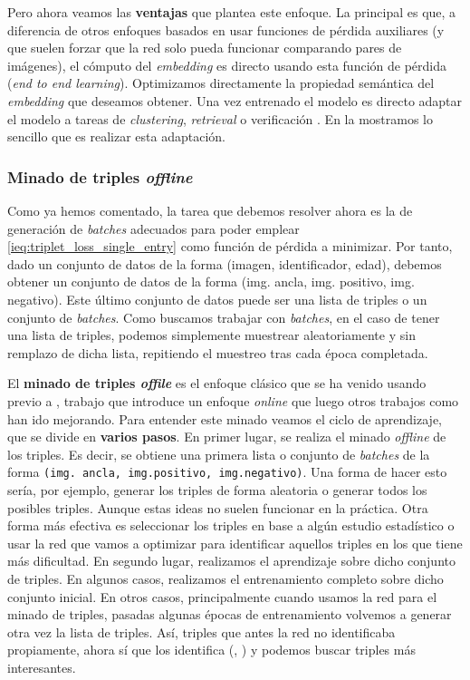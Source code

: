 Pero ahora veamos las \textbf{ventajas} que plantea este enfoque. La principal es que, a diferencia de otros enfoques basados en usar funciones de pérdida auxiliares (y que suelen forzar que la red solo pueda funcionar comparando pares de imágenes), el cómputo del \textit{embedding} es directo usando esta función de pérdida (\textit{end to end learning}). Optimizamos directamente la propiedad semántica del \textit{embedding} que deseamos obtener. Una vez entrenado el modelo es directo adaptar el modelo a tareas de \textit{clustering}, \textit{retrieval} o verificación \cite{informatica:principal}. En la  mostramos lo sencillo que es realizar esta adaptación.

\subsubsection{Minado de triples \textit{offline}} \label{isubs:enfoque_offline_minado_triples}

Como ya hemos comentado, la tarea que debemos resolver ahora es la de generación de \textit{batches} adecuados para poder emplear \eqref{ieq:triplet_loss_single_entry} como función de pérdida a minimizar. Por tanto, dado un conjunto de datos de la forma (imagen, identificador, edad), debemos obtener un conjunto de datos de la forma (img. ancla, img. positivo, img. negativo). Este último conjunto de datos puede ser una lista de triples o un conjunto de \textit{batches}. Como buscamos trabajar con \textit{batches}, en el caso de tener una lista de triples, podemos simplemente muestrear aleatoriamente y sin remplazo de dicha lista, repitiendo el muestreo tras cada época completada.

El \textbf{minado de triples \textit{offile}} es el enfoque clásico que se ha venido usando previo a \cite{informatica:facenet}, trabajo que introduce un enfoque \textit{online} que luego otros trabajos como \cite{informatica:principal} han ido mejorando. Para entender este minado veamos el ciclo de aprendizaje, que se divide en \textbf{varios pasos}. En primer lugar, se realiza el minado \textit{offline} de los triples. Es decir, se obtiene una primera lista o conjunto de \textit{batches} de la forma \lstinline{(img. ancla, img.positivo, img.negativo)}. Una forma de hacer esto sería, por ejemplo, generar los triples de forma aleatoria o generar todos los posibles triples. Aunque estas ideas no suelen funcionar en la práctica. Otra forma más efectiva es seleccionar los triples en base a algún estudio estadístico o usar la red que vamos a optimizar para identificar aquellos triples en los que tiene más dificultad. En segundo lugar, realizamos el aprendizaje sobre dicho conjunto de triples. En algunos casos, realizamos el entrenamiento completo sobre dicho conjunto inicial. En otros casos, principalmente cuando usamos la red para el minado de triples, pasadas algunas épocas de entrenamiento volvemos a generar otra vez la lista de triples. Así, triples que antes la red no identificaba propiamente, ahora sí que los identifica (, \cite{informatica:facenet}) y podemos buscar triples más interesantes.

